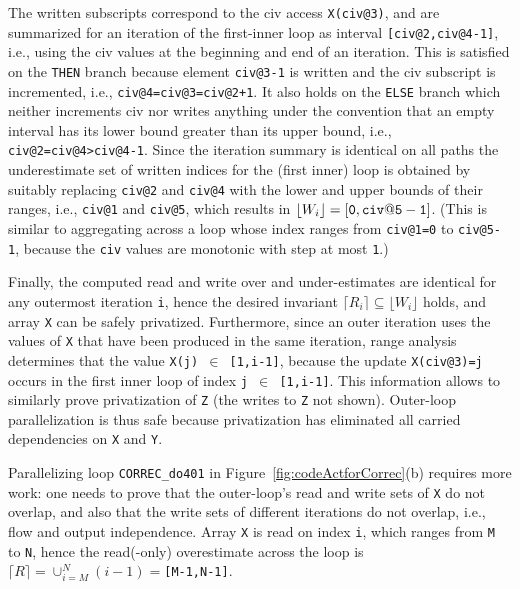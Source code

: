 \documentclass{sig-alternate}
\begin{document}
The written subscripts correspond to the {\sc civ} access {\tt X(civ@3)}, %
and are summarized for an iteration of the first-inner loop as
interval  {\tt[civ@2,civ@4-1]}, i.e., using the {\sc civ} values at 
the beginning and end of an iteration.
This is satisfied on the {\tt THEN} branch because element {\tt civ@3-1}
is written and the {\sc civ} subscript is incremented, i.e., 
{\tt civ@4=civ@3=civ@2+1}. It also holds on the {\tt ELSE} branch
which neither increments {\sc civ} nor writes anything under the convention 
that an empty interval has its lower bound greater than its upper bound,
i.e., {\tt civ@2=civ@4>civ@4-1}.
%
Since the iteration summary is identical on all paths the underestimate 
set of written indices for the (first inner) loop is obtained by suitably 
replacing {\tt civ@2} and {\tt civ@4} with the lower and upper bounds of 
their ranges, i.e., {\tt civ@1} and {\tt civ@5}, which results in 
$\lfloor W_i\rfloor={\tt [0,civ@5-1]}$.
(This is similar to aggregating across a loop whose index ranges 
    from {\tt{}civ@1=0} to {\tt{}civ@5-1}, because the {\tt civ} 
    values are monotonic with step at most {\tt 1}.)

Finally, the computed read and write over and under-estimates are identical 
for any outermost iteration {\tt i}, hence the desired invariant 
$\lceil R_i\rceil \subseteq \lfloor W_i\rfloor$ holds, and array {\tt X} 
can be safely privatized. 
%
Furthermore, since an outer iteration uses the values of {\tt X} that 
have been produced in the same iteration, range analysis determines that 
the value {\tt X(j) $\in$ [1,i-1]}, because the update 
{\tt X(civ@3)=j} occurs in the first inner loop of index {\tt j $\in$ [1,i-1]}. 
%
This information allows to similarly prove privatization 
of {\tt Z} (the writes to {\tt Z} not shown).
%
Outer-loop parallelization is thus safe because 
privatization has eliminated all carried dependencies on {\tt X} and {\tt Y}. %

\vspace{1ex}
Parallelizing loop {\tt CORREC\_do401} in Figure~\ref{fig:codeActforCorrec}(b) 
requires more work: one needs to prove that the outer-loop's read and write 
sets of {\tt X} do not overlap, and also that the write sets of  
different iterations do not overlap, i.e., flow and output independence. 
Array {\tt X} is read on index {\tt i}, which ranges from {\tt M} to {\tt N},
hence the read(-only) overestimate across the loop is 
{\tt$\lceil R \rceil =\cup_{i=M}^{N}(i-1)=$[M-1,N-1]}.
\end{document}

